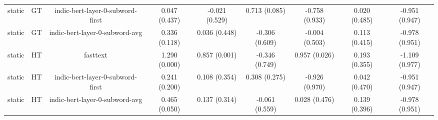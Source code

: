 \begin{sidewaystable}[htb]
\begin{tabular}{@{}ccccccccc@{}}
        static & GT & indic-bert-layer-0-subword-first & 0.047 (0.437) & -0.021 (0.529) & 0.713 (0.085) & -0.758 (0.933) & 0.020 (0.485) & -0.951 (0.947) \\
        static & GT & indic-bert-layer-0-subword-avg & 0.336 (0.118) & 0.036 (0.448) & -0.306 (0.609) & -0.004 (0.503) & 0.113 (0.415) & -0.978 (0.951) \\
        static & HT & fasttext & 1.290 (0.000) & 0.857 (0.001) & -0.346 (0.749) & 0.957 (0.026) & 0.193 (0.355) & -1.109 (0.977) \\
        static & HT & indic-bert-layer-0-subword-first & 0.241 (0.200) & 0.108 (0.354) & 0.308 (0.275) & -0.926 (0.970) & 0.042 (0.470) & -0.951 (0.947) \\
        static & HT & indic-bert-layer-0-subword-avg & 0.465 (0.050) & 0.137 (0.314) & -0.061 (0.559) & 0.028 (0.476) & 0.139 (0.396) & -0.978 (0.951) \\
        \bottomrule
    \end{tabular}
\end{sidewaystable}